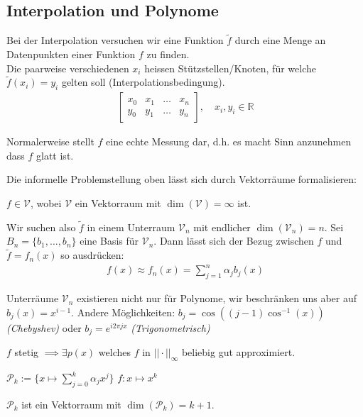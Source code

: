 \subsection{Interpolation und Polynome}
Bei der Interpolation versuchen wir eine Funktion $\tilde{f}$ durch eine Menge an Datenpunkten einer Funktion $f$ zu finden.\\
Die paarweise verschiedenen $x_i$ heissen Stützstellen/Knoten, für welche $\tilde{f}(x_i) = y_i$ gelten soll (Interpolationsbedingung).
\begin{align*}
	\begin{bmatrix}
		x_0 & x_1 & \ldots & x_n \\
		y_0 & y_1 & \ldots & y_n
	\end{bmatrix},
	\quad x_i, y_i \in \mathbb{R}
\end{align*}

Normalerweise stellt $f$ eine echte Messung dar, d.h. es macht Sinn anzunehmen dass $f$ glatt ist.

Die informelle Problemstellung oben lässt sich durch Vektorräume formalisieren:

$f \in \mathcal{V}$, wobei $\mathcal{V}$ ein Vektorraum mit $\dim(\mathcal{V}) = \infty$ ist.

Wir suchen also $\tilde{f}$ in einem Unterraum $\mathcal{V}_n$ mit endlicher $\dim(\mathcal{V}_n) = n$.
Sei $B_n = \{b_1,\ldots,b_n\}$ eine Basis für $\mathcal{V}_n$.
Dann lässt sich der Bezug zwischen $f$ und $\tilde{f} = f_n(x)$ so ausdrücken:
\begin{align*}
	f(x) \approx f_n(x) = \sum_{j=1}^n \alpha_j b_j(x)
\end{align*}

\inlineremark Unterräume $\mathcal{V}_n$ existieren nicht nur für Polynome, wir beschränken uns aber auf $b_j(x) = x^{i-1}$.
Andere Möglichkeiten: $b_j = \cos((j-1)\cos^{-1}(x))$ \textit{(Chebyshev)} oder $b_j = e^{i2\pi j x}$ \textit{(Trigonometrisch)}

 $f$ stetig $\implies \exists p(x)$ welches $f$ in $||\cdot||_\infty$ beliebig gut approximiert.

 $\mathcal{P}_k := \{ x \mapsto \sum_{j = 0}^{k} \alpha_j x^j \}$
 $f: x \mapsto x^k$

 $\mathcal{P}_k$ ist ein Vektorraum mit $\dim(\mathcal{P}_k) = k+1$.
